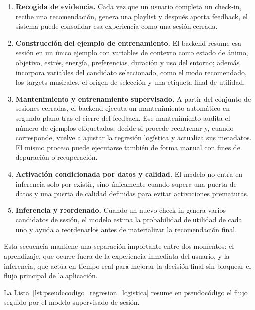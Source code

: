 \begin{enumerate}
    \item \textbf{Recogida de evidencia.} Cada vez que un usuario completa un
    check-in, recibe una recomendación, genera una playlist y después aporta
    feedback, el sistema puede consolidar esa experiencia como una sesión
    cerrada.
    \item \textbf{Construcción del ejemplo de entrenamiento.} El backend resume
    esa sesión en un único ejemplo con variables de contexto como estado de
    ánimo, objetivo, estrés, energía, preferencias, duración y uso del
    entorno; además incorpora variables del candidato seleccionado, como el
    modo recomendado, los targets musicales, el origen de selección y
    una etiqueta final de utilidad.
    \item \textbf{Mantenimiento y entrenamiento supervisado.} A partir del
    conjunto de sesiones cerradas, el backend ejecuta un mantenimiento
    automático en segundo plano tras el cierre del feedback. Ese mantenimiento
    audita el número de ejemplos etiquetados, decide si procede reentrenar y,
    cuando corresponde, vuelve a ajustar la regresión logística y actualiza
    sus metadatos. El mismo proceso puede ejecutarse también de forma manual
    con fines de depuración o recuperación.
    \item \textbf{Activación condicionada por datos y calidad.} El modelo no
    entra en inferencia solo por existir, sino únicamente cuando supera una
    puerta de datos y una puerta de calidad definidas para evitar activaciones
    prematuras.
    \item \textbf{Inferencia y reordenado.} Cuando un nuevo check-in genera
    varios candidatos de sesión, el modelo estima la probabilidad de utilidad
    de cada uno y ayuda a reordenarlos antes de materializar la recomendación
    final.
\end{enumerate}

Esta secuencia mantiene una separación importante entre dos momentos: el
aprendizaje, que ocurre fuera de la experiencia inmediata del usuario, y
la inferencia, que actúa en tiempo real para mejorar la decisión final
sin bloquear el flujo principal de la aplicación.

La Lista~\ref{lst:pseudocodigo_regresion_logistica} resume en pseudocódigo el
flujo seguido por el modelo supervisado de sesión.

